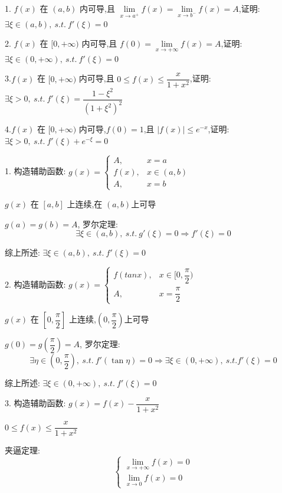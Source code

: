 \begin{proposition}
	1. $f(x)$ 在 $(a,b)$ 内可导,且 $\lim\limits_{x\rightarrow a^{+}}f(x)=\lim\limits_{x\rightarrow b^{-}}f(x)=A$,证明: $\exists \xi\in(a,b),\ s.t.\ f'(\xi)=0$

	2. $f(x)$ 在 $[0,+\infty)$ 内可导,且 $f(0)=\lim\limits_{x\rightarrow +\infty}f(x)=A$,证明: $\exists \xi\in(0,+\infty),\ s.t.\ f'(\xi)=0$

	3.$f(x)$ 在 $[0,+\infty)$ 内可导,且 $0\leq f(x)\leq \dfrac{x}{1+x^2}$,证明: $\exists \xi>0,\ s.t.\ f'(\xi)=\dfrac{1-\xi^2}{(1+\xi^2)^2}$

	4.$f(x)$ 在 $[0,+\infty)$ 内可导,$f(0)=1$,且 $|f(x)|\leq e^{-x}$,证明: $\exists \xi>0,\ s.t.\ f'(\xi)+e^{-\xi}=0$

\end{proposition}
\begin{solution}

	1. 构造辅助函数: $g(x) = \begin{cases}
		A, & x = a\\
		f(x),  & x\in(a,b) \\
		A, & x = b
	\end{cases}$

	$g(x)$ 在 $[a,b]$ 上连续,在 $(a,b)$上可导
	
	$g(a) = g(b) = A$, 罗尔定理:
	$$\exists\xi\in(a,b),\ s.t.\ g'(\xi)=0\Rightarrow f'(\xi)=0$$

	综上所述: $\exists \xi\in(a,b),\ s.t.\ f'(\xi)=0$


	2. 构造辅助函数: $g(x) = \begin{cases}
		f(tan x), & x\in[0,\dfrac{\pi}{2}) \\
		A, & x=\dfrac{\pi}{2}
	\end{cases} $

	$g(x)$ 在 $[0,\dfrac{\pi}{2}]$ 上连续,$(0,\dfrac{\pi}{2})$上可导
	
	$g(0)=g(\dfrac{\pi}{2})=A$, 罗尔定理:
	$$\exists\eta\in(0,\frac{\pi}{2}),\ s.t.\ f'(\tan \eta)=0\Rightarrow \exists \xi\in(0,+\infty),\ s.t. f'(\xi)=0$$

	综上所述: $\exists \xi\in(0,+\infty),\ s.t.\ f'(\xi)=0$


	3. 构造辅助函数: $g(x)=f(x)-\dfrac{x}{1+x^2}$

	$0\leq f(x)\leq \dfrac{x}{1+x^2}$
	
	夹逼定理:
	$$\begin{cases}
		\lim\limits_{x\rightarrow +\infty}f(x)=0 \\
		\lim\limits_{x\rightarrow 0}f(x)=0
	\end{cases}$$


\end{solution}
